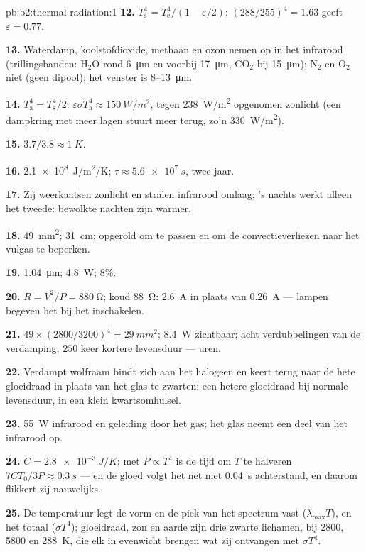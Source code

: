 \begin{solution}{pb:b2:thermal-radiation:1}
\textbf{12.} $T_{\text{s}}^4 = T_{\text{e}}^4/(1 - \varepsilon/2)$;
$(288/255)^4 = 1.63$
geeft $\varepsilon = 0.77$.

\textbf{13.} Waterdamp, koolstofdioxide, methaan en ozon nemen op in het
infrarood (trillingsbanden: H$_2$O rond \qty{6}{\micro m} en voorbij
\qty{17}{\micro m}, CO$_2$ bij \qty{15}{\micro m}); N$_2$ en O$_2$ niet (geen
dipool); het venster is \qty{8}{}--\qty{13}{\micro m}.

\textbf{14.} $T_{\text{a}}^4 = T_{\text{s}}^4/2$:
$\varepsilon\sigma T_{\text{a}}^4 \approx
\qty{150}{W/m^2}$, tegen
\qty{238}{W/m^2} opgenomen zonlicht (een
dampkring met meer lagen stuurt meer terug, zo'n \qty{330}{W/m^2}).

\textbf{15.} $3.7/3.8 \approx \qty{1}{K}$.

\textbf{16.} \qty{2.1e8}{J/m^2/K}; $\tau \approx \qty{5.6e7}{s}$, twee jaar.

\textbf{17.} Zij weerkaatsen zonlicht en stralen infrarood omlaag; 's nachts
werkt alleen het tweede: bewolkte nachten zijn warmer.

\textbf{18.} \qty{49}{mm^2}; \qty{31}{cm}; opgerold om te passen en om de
convectieverliezen naar het vulgas te beperken.

\textbf{19.} \qty{1.04}{\micro m}; \qty{4.8}{W}; $8\%$.

\textbf{20.} $R = V^2/P = \qty{880}{\ohm}$; koud \qty{88}{\ohm}: \qty{2.6}{A}
in plaats van \qty{0.26}{A} --- lampen begeven het bij het inschakelen.

\textbf{21.} $49 \times (2800/3200)^4 = \qty{29}{mm^2}$; \qty{8.4}{W}
zichtbaar; acht
verdubbelingen van de verdamping, $250$ keer kortere levensduur --- uren.

\textbf{22.} Verdampt wolfraam bindt zich aan het halogeen en keert terug
naar de hete gloeidraad in plaats van het glas te zwarten: een hetere gloeidraad
bij normale levensduur, in een klein kwartsomhulsel.

\textbf{23.} \qty{55}{W} infrarood en geleiding door het gas; het
glas neemt een deel van het infrarood op.

\textbf{24.} $C = \qty{2.8e-3}{J/K}$; met $P \propto T^4$ is de tijd om $T$
te halveren
$7CT_0/3P \approx \qty{0.3}{s}$ --- en de gloed volgt het net
met \qty{0.04}{s} achterstand, en daarom flikkert zij nauwelijks.

\textbf{25.} De temperatuur legt de vorm en de piek van het spectrum vast
($\lambda_{\max}T$), en het totaal ($\sigma T^4$); gloeidraad, zon en aarde
zijn drie zwarte lichamen, bij \qty{2800}{}, \qty{5800}{} en \qty{288}{K}, die elk
in evenwicht brengen wat zij ontvangen met $\sigma T^4$.
\end{solution}
